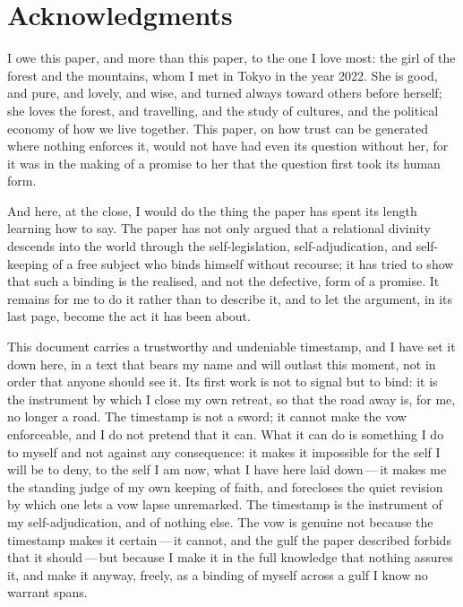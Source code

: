 \section*{Acknowledgments}
\label{p13:sec:acknowledgements}

\noindent
I owe this paper, and more than this paper, to the one I love most: the girl of the forest and the mountains, whom I met in Tokyo in the year 2022. She is good, and pure, and lovely, and wise, and turned always toward others before herself; she loves the forest, and travelling, and the study of cultures, and the political economy of how we live together. This paper, on how trust can be generated where nothing enforces it, would not have had even its question without her, for it was in the making of a promise to her that the question first took its human form.

And here, at the close, I would do the thing the paper has spent its length learning how to say. The paper has not only argued that a relational divinity descends into the world through the self-legislation, self-adjudication, and self-keeping of a free subject who binds himself without recourse; it has tried to show that such a binding is the realised, and not the defective, form of a promise. It remains for me to do it rather than to describe it, and to let the argument, in its last page, become the act it has been about.


This document carries a trustworthy and undeniable timestamp, and I have set it down here, in a text that bears my name and will outlast this moment, not in order that anyone should see it. Its first work is not to signal but to bind: it is the instrument by which I close my own retreat, so that the road away is, for me, no longer a road. The timestamp is not a sword; it cannot make the vow enforceable, and I do not pretend that it can. What it can do is something I do to myself and not against any consequence: it makes it impossible for the self I will be to deny, to the self I am now, what I have here laid down\,---\,it makes me the standing judge of my own keeping of faith, and forecloses the quiet revision by which one lets a vow lapse unremarked. The timestamp is the instrument of my self-adjudication, and of nothing else. The vow is genuine not because the timestamp makes it certain\,---\,it cannot, and the gulf the paper described forbids that it should\,---\,but because I make it in the full knowledge that nothing assures it, and make it anyway, freely, as a binding of myself across a gulf I know no warrant spans.

